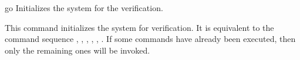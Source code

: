 \begin{nusmvCommand} {go} {Initializes the system for the verification.}


This command initializes the system for verification. It is equivalent
to the command sequence ,
, , \linebreak
{}, ,
.  If some commands have already been
executed, then only the remaining ones will be invoked.

\end{nusmvCommand}
